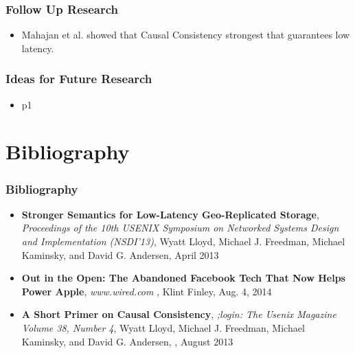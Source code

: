\documentclass{beamer}
\begin{document}
\begin{frame}
\frametitle{Follow Up Research}
\begin{itemize}
\pause \item Mahajan et al. showed that Causal Consistency strongest that guarantees low latency.
\end{itemize}  
\end{frame}

\begin{frame}
\frametitle{Ideas for Future Research}
\begin{itemize}
\pause \item p1 
\end{itemize}  
\end{frame}



\section{Bibliography} 

\begin{frame}
\frametitle{Bibliography}


\begin{itemize}
\item \textbf{Stronger Semantics for Low-Latency Geo-Replicated Storage}, 
\textit{Proceedings of the 10th USENIX Symposium on Networked Systems Design and Implementation (NSDI’13)}, 
Wyatt Lloyd, Michael J. Freedman, Michael Kaminsky, and David G. Andersen, 
April 2013

\item \textbf{Out in the Open: The Abandoned Facebook Tech That Now Helps Power Apple}, 
\textit{www.wired.com}
, Klint Finley, Aug. 4, 2014

\item \textbf{A Short Primer on Causal Consistency}, 
\textit{;login: The Usenix Magazine Volume 38, Number 4}, 
Wyatt Lloyd, Michael J. Freedman, Michael Kaminsky, and David G. Andersen, , August 2013


\end{itemize}  
\end{frame}
\end{document}
